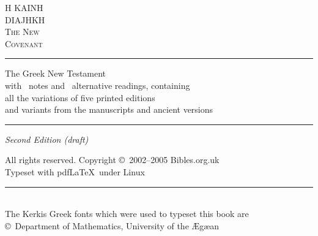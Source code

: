 \pagestyle{empty}


\begin{center}
\Huge
H KAINH\\
DIAJHKH\\
\scshape
The New\\
Covenant\\
\rule{\linewidth}{1pt}
\LARGE
The Greek New Testament\\
\large
with \totalfnt\ notes and \totalfnvar\ alternative readings, containing\\
all the variations of five printed editions\\
and variants from the manuscripts and ancient versions
\rule{\linewidth}{1pt}

\biblesorguk
\end{center}
\clearpage

\begin{center}
{\Large\itshape Second Edition (draft)}
\end{center}

\begin{center}
\normalsize
All rights reserved. Copyright \copyright\ 2002--2005 Bibles.org.uk\\
Typeset with pdf\LaTeX\ under Linux \shorttoday\\
\rule{0.9\linewidth}{0.8pt}\\
The Kerkis Greek fonts which were used to typeset this book are\\
\copyright\ Department of Mathematics, University of the {\AE}g{\ae}an
\end{center}
